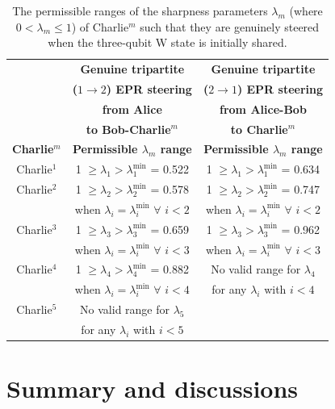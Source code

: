 \documentclass[pra,a4paper,aps,twocolumn,showpacs,superscriptaddress,groupedaddress]{revtex4}
\begin{document}
{\centering
	\begin{table}[t]\footnotesize
			\begin{tabular}{|c | c || c |} 
				\hline 
				& \textbf{Genuine tripartite} & \textbf{Genuine tripartite} \\
				& \textbf{($1 \rightarrow 2$) EPR steering} & \textbf{($2 \rightarrow 1$) EPR steering}\\
				& \textbf{from Alice} & \textbf{from Alice-Bob} \\
				& \textbf{to Bob-Charlie$^m$} & \textbf{to Charlie$^m$} \\
				\hline
				{\bf Charlie$^m$} & {\bf Permissible $\lambda_{m}$ range}  & {\bf Permissible $\lambda_{m}$ range}  \\ [0.5ex] 
				\hline
				\hline
				Charlie$^1$ & 1 $\geq \lambda_1 > \lambda_1^{\text{min}}$ = 0.522  & 1 $\geq \lambda_1 > \lambda_1^{\text{min}}$ = 0.634  \\ 
				\hline
				Charlie$^2$ &1 $\geq \lambda_2 > \lambda_2^{\text{min}}$ = 0.578 &1 $\geq \lambda_2 > \lambda_2^{\text{min}}$ = 0.747 \\
				& when $\lambda_i = \lambda_i^{\text{min}}$ $\forall$ $i < 2$ & when $\lambda_i = \lambda_i^{\text{min}}$ $\forall$ $i < 2$ \\
				\hline
				Charlie$^3$ &1 $\geq \lambda_3 > \lambda_3^{\text{min}}$ = 0.659 &1 $\geq \lambda_3 > \lambda_3^{\text{min}}$ = 0.962 \\
				& when $\lambda_i = \lambda_i^{\text{min}}$ $\forall$ $i < 3$ & when $\lambda_i = \lambda_i^{\text{min}}$ $\forall$ $i < 3$ \\
				\hline
				Charlie$^4$ &1 $\geq \lambda_4 > \lambda_4^{\text{min}}$ = 0.882 &No valid range for $\lambda_4$  \\
				& when $\lambda_i = \lambda_i^{\text{min}}$ $\forall$ $i < 4$ & for any $\lambda_i$ with $i<4$ \\
				\hline
				Charlie$^5$ & No valid range for $\lambda_5$  &  \\
				& for any $\lambda_i$ with $i<5$ &  \\
				\hline
			\end{tabular}
			\caption{The permissible ranges of the sharpness parameters $\lambda_m$ (where $0 < \lambda_m \leq 1$) of Charlie$^m$ such that they are genuinely steered when the three-qubit W state  is initially shared. }
			\label{tab4}
	\end{table}
} 


\section{Summary and discussions} \label{s4}
\end{document}
